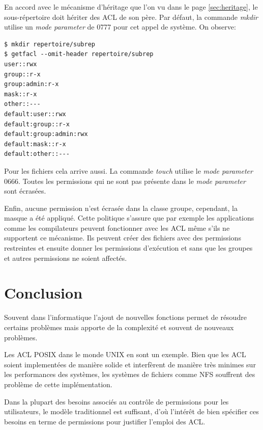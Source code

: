 \documentclass{article}
\begin{document}
En accord avec le mécanisme d'héritage que l'on vu dans le page \ref{sec:heritage}, le sous-répertoire doit hériter des ACL de son père. Par défaut, la commande \emph{mkdir} utilise un \emph{mode parameter} de 0777 pour cet appel de système. On observe:

\begin{verbatim}
$ mkdir repertoire/subrep 
$ getfacl --omit-header repertoire/subrep 
user::rwx 
group::r-x 
group:admin:r-x 
mask::r-x 
other::--- 
default:user::rwx 
default:group::r-x 
default:group:admin:rwx 
default:mask::r-x 
default:other::---
\end{verbatim}

Pour les fichiers cela arrive aussi. La commande \emph{touch} utilise le \emph{mode parameter} 0666. Toutes les permissions qui ne sont pas présente dans le \emph{mode parameter} sont écrasées.

Enfin, aucune permission n'est écrasée dans la classe groupe, cependant, la masque a été appliqué. Cette politique s'assure que par exemple les applications comme les compilateurs peuvent fonctionner avec les ACL même s'ils ne supportent ce mécanisme. Ils peuvent créer des fichiers avec des permissions restreintes et ensuite donner les permissions d'exécution et sans que les groupes et autres permissions ne soient affectés.

\section{Conclusion}
Souvent dans l'informatique l'ajout de nouvelles fonctions permet de résoudre certains problèmes mais apporte de la complexité et souvent de nouveaux problèmes.

Les ACL POSIX dans le monde UNIX en sont un exemple. Bien que les ACL soient implementées de manière solide et interfèrent de manière très minimes sur les performances des systèmes, les systèmes de fichiers comme NFS souffrent des problème de cette implémentation.

Dans la plupart des besoins associés au contrôle de permissions pour les utilisateurs, le modèle traditionnel est suffisant, d'où l'intérêt de bien spécifier ces besoins en terme de permissions pour justifier l'emploi des ACL. 

\newpage
\end{document}
